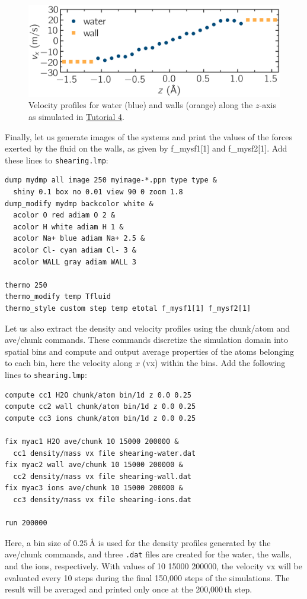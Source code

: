 \documentclass[9pt,tutorial]{livecoms}
\newcommand{\lmpcmd}[1]{\hspace{0pt}\colorbox{listing}{\textcolor{command}{\small{#1}}}\hspace{0pt}} %
\newcommand{\flecmd}[1]{\textcolor{command}{\texttt{#1}}} %
\begin{document}
\begin{figure}
\centering
\includegraphics[width=\linewidth]{NANOSHEAR-profiles}
\caption{Velocity profiles for water (blue) and walls (orange) along the $z$-axis as
simulated in \hyperref[sheared-confined-label]{Tutorial 4}.}
\label{fig:NANOSHEAR-profiles}
\end{figure}

Finally, let us generate images of the systems and print the values of the
forces exerted by the fluid on the walls, as given by \lmpcmd{f\_mysf1[1]}
and \lmpcmd{f\_mysf2[1]}.  Add these lines to \flecmd{shearing.lmp}:
\begin{lstlisting}
dump mydmp all image 250 myimage-*.ppm type type &
  shiny 0.1 box no 0.01 view 90 0 zoom 1.8
dump_modify mydmp backcolor white &
  acolor O red adiam O 2 &
  acolor H white adiam H 1 &
  acolor Na+ blue adiam Na+ 2.5 &
  acolor Cl- cyan adiam Cl- 3 &
  acolor WALL gray adiam WALL 3

thermo 250
thermo_modify temp Tfluid
thermo_style custom step temp etotal f_mysf1[1] f_mysf2[1]
\end{lstlisting}
Let us also extract the density and velocity profiles using
the \lmpcmd{chunk/atom} and \lmpcmd{ave/chunk} commands.  {\color{blue}These
commands discretize the simulation domain into spatial bins and compute and output
average properties of the atoms belonging to each bin, here the velocity
along $x$ (\lmpcmd{vx}) within the bins.}  Add the following lines to \flecmd{shearing.lmp}:
\begin{lstlisting}
compute cc1 H2O chunk/atom bin/1d z 0.0 0.25
compute cc2 wall chunk/atom bin/1d z 0.0 0.25
compute cc3 ions chunk/atom bin/1d z 0.0 0.25

fix myac1 H2O ave/chunk 10 15000 200000 &
  cc1 density/mass vx file shearing-water.dat
fix myac2 wall ave/chunk 10 15000 200000 &
  cc2 density/mass vx file shearing-wall.dat
fix myac3 ions ave/chunk 10 15000 200000 &
  cc3 density/mass vx file shearing-ions.dat

run 200000
\end{lstlisting}
Here, a bin size of $0.25\,\text{\AA{}}$ is used for the density
profiles generated by the \lmpcmd{ave/chunk} commands, and three
\flecmd{.dat} files are created for the water, the walls, and the ions,
respectively.  With values of \lmpcmd{10 15000 200000}, the velocity
\lmpcmd{vx} will be evaluated every 10 steps during the final 150,000
steps of the simulations.  The result will be averaged and printed only
once at the 200,000\,th step.
\end{document}
